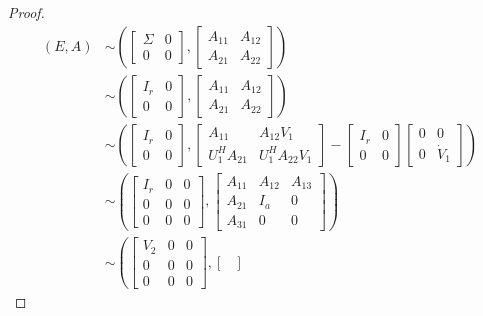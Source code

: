 \documentclass[]{book}
\theoremstyle{definition}
\theoremstyle{definition}
\theoremstyle{definition}
\theoremstyle{definition}
\theoremstyle{remark}
\begin{document}
\begin{proof}
\begin{align*}
(E,A) & 
\sim   
\left(\begin{bmatrix}
\Sigma & 0 \\
0 & 0
\end{bmatrix},
\begin{bmatrix}
A_{11} & A_{12} \\
A_{21} & A_{22}
\end{bmatrix}\right) \\
& \sim   
\left(\begin{bmatrix}
I_r & 0 \\
0 & 0
\end{bmatrix},
\begin{bmatrix}
A_{11} & A_{12} \\
A_{21} & A_{22}
\end{bmatrix}\right) \\
& \sim   
\left(\begin{bmatrix}
I_r & 0 \\
0 & 0
\end{bmatrix},
\begin{bmatrix}
A_{11} & A_{12}V_1 \\
U_1^HA_{21} & U_1^HA_{22}V_1 
\end{bmatrix} -
\begin{bmatrix} I_r & 0 \\ 0 & 0 \end{bmatrix}
\begin{bmatrix} 0 & 0 \\ 0 & \dot V_1 \end{bmatrix}
\right) \\
& \sim   
\left(\begin{bmatrix}
I_r & 0 & 0 \\
0 & 0 & 0 \\
0 & 0 & 0
\end{bmatrix},
\begin{bmatrix}
A_{11} & A_{12} & A_{13}\\
A_{21} & I_a & 0 \\
A_{31} & 0  & 0
\end{bmatrix}\right) \\
& \sim   
\left(\begin{bmatrix}
V_2 & 0 & 0 \\
0 & 0 & 0 \\
0 & 0 & 0
\end{bmatrix},
\begin{bmatrix}

\end{bmatrix}
\end{align*}
\end{proof}
\end{document}
